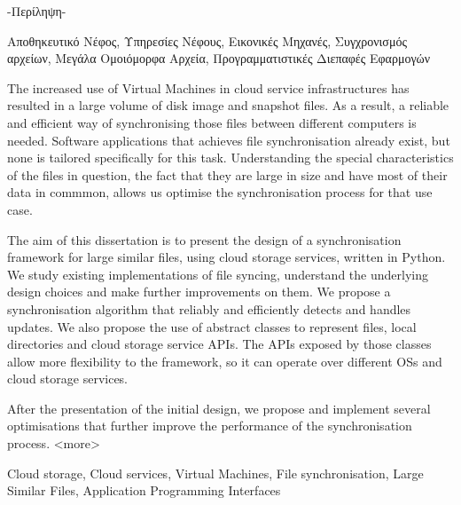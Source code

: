 \begin{abstractgr}
  -Περίληψη-
\begin{keywordsgr}
    Αποθηκευτικό Νέφος, Υπηρεσίες Νέφους, Εικονικές Μηχανές, Συγχρονισμός αρχείων, Μεγάλα Ομοιόμορφα Αρχεία, Προγραμματιστικές Διεπαφές Εφαρμογών
\end{keywordsgr}
\end{abstractgr}


\begin{abstracten}
  The increased use of Virtual Machines in cloud service infrastructures has resulted in a large volume of disk image and snapshot files. As a result, a reliable and efficient way of synchronising those files between different computers is needed. Software applications that achieves file synchronisation already exist, but none is tailored specifically for this task. Understanding the special characteristics of the files in question, the fact that they are large in size and have most of their data in commmon, allows us optimise the synchronisation process for that use case.

  The aim of this dissertation is to present the design of a synchronisation framework for large similar files, using cloud storage services, written in Python. We study existing implementations of file syncing, understand the underlying design choices and make further improvements on them. We propose a synchronisation algorithm that reliably and efficiently detects and handles updates. We also propose the use of abstract classes to represent files, local directories and cloud storage service APIs. The APIs exposed by those classes allow more flexibility to the framework, so it can operate over different OSs and cloud storage services.

  After the presentation of the initial design, we propose and implement several optimisations that further improve the performance of the synchronisation process. <more>

\begin{keywordsen}
    Cloud storage, Cloud services, Virtual Machines, File synchronisation, Large Similar Files, Application Programming Interfaces
\end{keywordsen}
\end{abstracten}


